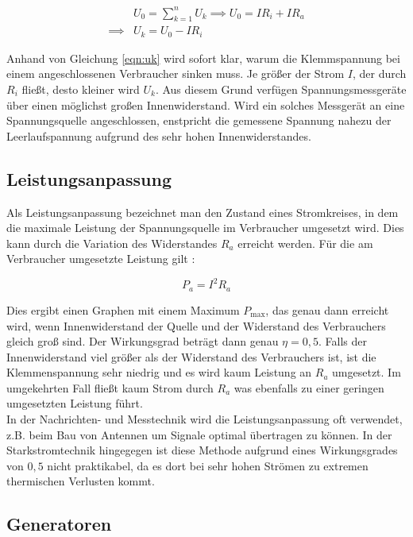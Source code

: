 \begin{align}
  &U_0 = \sum_{k=1}^{n} U_k \implies U_0 = I R_i + I R_a \\
  \implies &U_k = U_0 - I R_i \label{eqn:uk}
\end{align}

\noindent Anhand von Gleichung \eqref{eqn:uk} wird sofort klar, warum die Klemmspannung bei einem angeschlossenen Verbraucher sinken muss.
Je größer der Strom $I$, der durch $R_i$ fließt, desto kleiner wird $U_k$. Aus diesem Grund verfügen Spannungsmessgeräte über einen möglichst großen Innenwiderstand.
Wird ein solches Messgerät an eine Spannungsquelle angeschlossen, enstpricht die gemessene Spannung nahezu der Leerlaufspannung aufgrund des sehr hohen Innenwiderstandes.

\subsection{Leistungsanpassung}
Als Leistungsanpassung bezeichnet man den Zustand eines Stromkreises, in dem die maximale Leistung der Spannungsquelle im Verbraucher umgesetzt wird.
Dies kann durch die Variation des Widerstandes $R_a$ erreicht werden. Für die am Verbraucher umgesetzte Leistung gilt \cite[S.2]{anleitung}:

\begin{equation}
  P_a = I^2 R_a
\end{equation}

\noindent Dies ergibt einen Graphen mit einem Maximum $P_{\text{max}}$, das genau dann erreicht wird, wenn Innenwiderstand der Quelle und der Widerstand des Verbrauchers gleich groß sind.
Der Wirkungsgrad beträgt dann genau $\eta = 0,5$. Falls der Innenwiderstand viel größer als der Widerstand des Verbrauchers ist, ist die Klemmenspannung sehr niedrig und es wird kaum Leistung an $R_a$ umgesetzt.
Im umgekehrten Fall fließt kaum Strom durch $R_a$ was ebenfalls zu einer geringen umgesetzten Leistung führt. \\

\noindent In der Nachrichten- und Messtechnik wird die Leistungsanpassung oft verwendet, z.B. beim Bau von Antennen um Signale optimal übertragen zu können.
In der Starkstromtechnik hingegegen ist diese Methode aufgrund eines Wirkungsgrades von $0,5$ nicht praktikabel, da es dort bei sehr hohen Strömen zu extremen thermischen Verlusten kommt.

\subsection{Generatoren}

